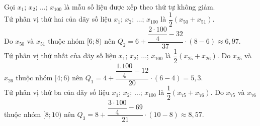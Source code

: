\begin{ex}
{		Gọi $x_1$; $x_2$; $\ldots$; $x_{100}$ là mẫu số liệu được xếp theo thứ tự không giảm.\\ 
		Tứ phân vị thứ hai của dãy  số liệu $x_1$; $x_2$; $\ldots$; $x_{100}$ là ${\dfrac{1}{2}\left(x_{50}+x_{51}\right)}$.\\
		 Do ${x_{50}}$ và ${x_{51}}$ thuộc nhóm ${[6; 8)}$ nên ${Q_2=6+\dfrac{\dfrac{2 \cdot 100}{4}-32}{37} \cdot(8-6) \approx 6,97}$.\\
		Tứ phân vị thứ  nhất của dãy số liệu $x_1$; $x_2$; $\ldots$; $x_{100}$ là ${\dfrac{1}{2}\left(x_{25}+x_{26}\right)}$. Do ${x_{25}}$ và ${x_{26}}$ thuộc nhóm ${[4; 6)}$ nên ${Q_1=4+\dfrac{\dfrac{1.100}{4}-12}{20} \cdot(6-4)=5,3}$.\\
	Tứ phân vị thứ ba của dãy số liệu $x_1$; $x_2$; $\ldots$; $x_{100}$ là  ${\dfrac{1}{2}\left(x_{75}+x_{76}\right)}$. Do ${x_{75}}$ và ${x_{76}}$ thuộc nhóm ${[8; 10)}$ nên ${Q_3=8+\dfrac{\dfrac{3 \cdot 100}{4}-69}{21} \cdot(10-8) \approx 8,57}$.}
\end{ex}

